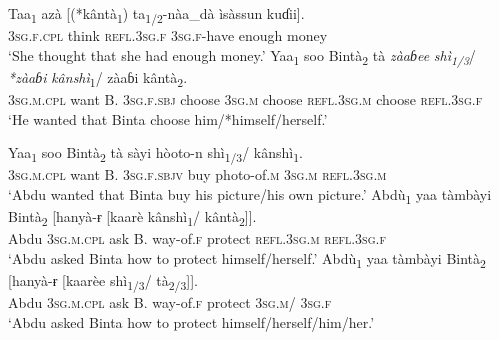 \documentclass[output=paper]{langscibook}
\begin{document}
\ea%
    \label{ex:Abdoulaye:24}
    \ea \label{ex:Abdoulaye:24a}
    \gll Taa\textsubscript{1} azà  [(*kântà\textsubscript{1})  ta\textsubscript{1/2}{}-nàa\_dà  ìsàssun  kuɗii].\\
    \textsc{3sg.f.cpl}  think  \textsc{refl.3sg.f}  \textsc{3sg.f}-have  enough  money\\
    \glt `She thought that she had enough money.’
    \ex \label{ex:Abdoulaye:24b}
    \gll Yaa\textsubscript{1}  soo  Bintà\textsubscript{2}  tà  \textit{zàaɓee}  \textit{shì\textsubscript{1/3}}/  \textit{*zàaɓi}  \textit{kânshì}\textsubscript{1}/ zàaɓi	kântà\textsubscript{2}.\\
    \textsc{3sg.m.cpl}  want  B.  \textsc{3sg.f.sbj}  choose  \textsc{3sg.m}  choose  \textsc{refl.3sg.m}    choose  \textsc{refl.3sg.f}\\
    \glt `He wanted that Binta choose him/*himself/herself.’
    \z
\z



\ea%
    \label{ex:Abdoulaye:25}
    \ea \label{ex:Abdoulaye:25a}
    \gll Yaa\textsubscript{1}  soo  Bintà\textsubscript{2}  tà  sàyi  hòoto-n  shì\textsubscript{1/3}/  kânshì\textsubscript{1}.\\
    \textsc{3sg.m.cpl}  want  B.  \textsc{3sg.f.sbjv}  buy  photo-of.\textsc{m}  \textsc{3sg.m}  \textsc{refl.3sg.m}\\
    \glt `Abdu wanted that Binta buy his picture/his own picture.’
    \ex \label{ex:Abdoulaye:25b}
    \gll Abdù\textsubscript{1}  yaa  tàmbàyi  Bintà\textsubscript{2}  [hanyà-ɍ  [kaarè  kânshì\textsubscript{1}/  kântà\textsubscript{2}]].\\
    Abdu  \textsc{3sg.m.cpl}  ask  B.  way-of.\textsc{f}  protect  \textsc{refl.3sg.m}  \textsc{refl.3sg.f}\\
    \glt `Abdu asked Binta how to protect himself/herself.’
    \ex \label{ex:Abdoulaye:25c}
    \gll Abdù\textsubscript{1}  yaa  tàmbàyi  Bintà\textsubscript{2}  [hanyà-ɍ  [kaarèe  shì\textsubscript{1/3}/  tà\textsubscript{2/3}]].\\
    Abdu  \textsc{3sg.m.cpl}  ask  B.  way-of.\textsc{f}  protect  \textsc{3sg.m}/  \textsc{3sg.f}\\
    \glt `Abdu asked Binta how to protect himself/herself/him/her.’
    \z
\z 
  
  
\end{document}
